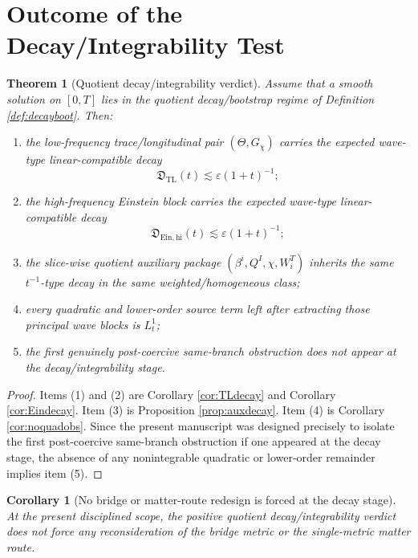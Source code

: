 \documentclass[11pt]{article}
\newtheorem{corollary}{Corollary}
\newtheorem{theorem}{Theorem}
\begin{document}
\section{Outcome of the Decay/Integrability Test}

\begin{theorem}[Quotient decay/integrability verdict]
\label{thm:verdict}
Assume that a smooth solution on \([0,T]\) lies in the quotient decay/bootstrap regime of Definition \ref{def:decayboot}. Then:
\begin{enumerate}
    \item the low-frequency trace/longitudinal pair \((\Theta,G_\chi)\) carries the expected wave-type linear-compatible decay
    \[
    \mathfrak D_{\mathrm{TL}}(t)\lesssim \varepsilon(1+t)^{-1};
    \]
    \item the high-frequency Einstein block carries the expected wave-type linear-compatible decay
    \[
    \mathfrak D_{\mathrm{Ein,hi}}(t)\lesssim \varepsilon(1+t)^{-1};
    \]
    \item the slice-wise quotient auxiliary package \((\beta^i,Q^I,\chi,W_i^T)\) inherits the same \(t^{-1}\)-type decay in the same weighted/homogeneous class;
    \item every quadratic and lower-order source term left after extracting those principal wave blocks is \(L_t^1\);
    \item the first genuinely post-coercive same-branch obstruction does \emph{not} appear at the decay/integrability stage.
\end{enumerate}
\end{theorem}

\begin{proof}
Items (1) and (2) are Corollary \ref{cor:TLdecay} and Corollary \ref{cor:Eindecay}. Item (3) is Proposition \ref{prop:auxdecay}. Item (4) is Corollary \ref{cor:noquadobs}. Since the present manuscript was designed precisely to isolate the first post-coercive same-branch obstruction if one appeared at the decay stage, the absence of any nonintegrable quadratic or lower-order remainder implies item (5).
\end{proof}

\begin{corollary}[No bridge or matter-route redesign is forced at the decay stage]
\label{cor:nodeeper}
At the present disciplined scope, the positive quotient decay/integrability verdict does not force any reconsideration of the bridge metric or the single-metric matter route.
\end{corollary}
\end{document}
